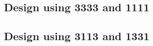 \subsection{Design using 3333 and 1111}


 \begin{center}




 \end{center}



\subsection{Design using 3113 and 1331}


 \begin{center}




 \end{center}



